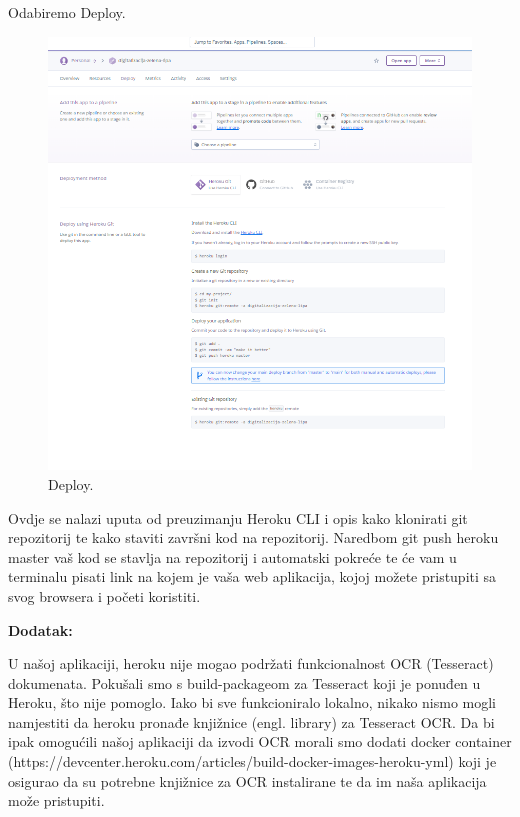 			 Odabiremo Deploy.
			 \begin{figure}[H]
			 	\includegraphics[scale=0.7]{slike/Deploy.png} 
			 	\centering
			 	\caption{ Deploy.}
			 	\label{DS}
			 \end{figure}
			 
			 Ovdje se nalazi uputa od preuzimanju Heroku CLI i opis kako klonirati git repozitorij te kako staviti završni kod na repozitorij. Naredbom git push heroku master vaš kod se stavlja na repozitorij i automatski pokreće te će vam u terminalu pisati link na kojem je vaša web aplikacija, kojoj možete pristupiti sa svog browsera i početi koristiti.
			 \eject
			 
			 \textbf{Dodatak:}
			 
			 U našoj aplikaciji, heroku nije mogao podržati funkcionalnost OCR (Tesseract) dokumenata. Pokušali smo s build-packageom za Tesseract koji je ponuđen u Heroku, što nije pomoglo. Iako bi sve funkcioniralo lokalno, nikako nismo mogli namjestiti da heroku pronađe knjižnice (engl. library) za Tesseract OCR. Da bi ipak omogućili našoj aplikaciji da izvodi OCR morali smo dodati docker container (https://devcenter.heroku.com/articles/build-docker-images-heroku-yml) koji je osigurao da su potrebne knjižnice za OCR instalirane te da im naša aplikacija može pristupiti.
			 
			 
			
			
			 
			
			
			\eject 